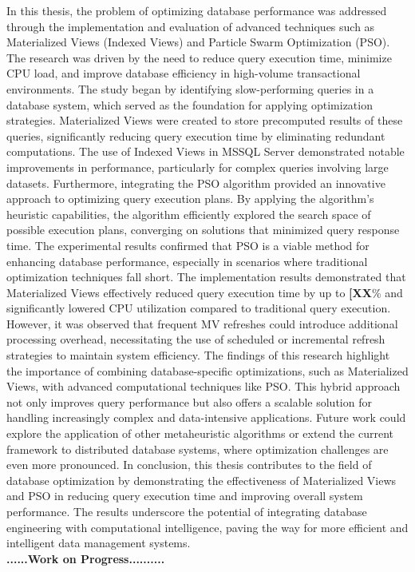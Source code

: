 In this thesis, the problem of optimizing database performance was addressed through the implementation and evaluation of advanced techniques such as Materialized Views (Indexed Views) and Particle Swarm Optimization (PSO). The research was driven by the need to reduce query execution time, minimize CPU load, and improve database efficiency in high-volume transactional environments. The study began by identifying slow-performing queries in a database system, which served as the foundation for applying optimization strategies. Materialized Views were created to store precomputed results of these queries, significantly reducing query execution time by eliminating redundant computations. The use of Indexed Views in MSSQL Server demonstrated notable improvements in performance, particularly for complex queries involving large datasets.
Furthermore, integrating the PSO algorithm provided an innovative approach to optimizing query execution plans. By applying the algorithm's heuristic capabilities, the algorithm efficiently explored the search space of possible execution plans, converging on solutions that minimized query response time. The experimental results confirmed that PSO is a viable method for enhancing database performance, especially in scenarios where traditional optimization techniques fall short.
The implementation results demonstrated that Materialized Views effectively reduced query execution time by up to \textbf{[XX}\% and significantly lowered CPU utilization compared to traditional query execution. However, it was observed that frequent MV refreshes could introduce additional processing overhead, necessitating the use of scheduled or incremental refresh strategies to maintain system efficiency.
The findings of this research highlight the importance of combining database-specific optimizations, such as Materialized Views, with advanced computational techniques like PSO. This hybrid approach not only improves query performance but also offers a scalable solution for handling increasingly complex and data-intensive applications. Future work could explore the application of other metaheuristic algorithms or extend the current framework to distributed database systems, where optimization challenges are even more pronounced.
In conclusion, this thesis contributes to the field of database optimization by demonstrating the effectiveness of Materialized Views and PSO in reducing query execution time and improving overall system performance. The results underscore the potential of integrating database engineering with computational intelligence, paving the way for more efficient and intelligent data management systems.\\
\textbf{......\textbf{Work on Progress}..........}       